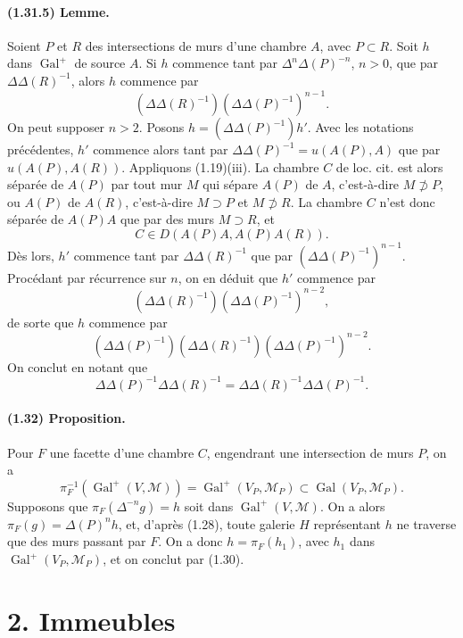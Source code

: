 \documentclass[10pt]{article}
\begin{document}
\paragraph{(1.31.5) Lemme.} Soient \(P\) et \(R\) des intersections de murs d'une chambre \(A\), avec \(P\subset R\). Soit \(h\) dans \(\operatorname{Gal}^+\) de source \(A\). Si \(h\) commence tant par \(\Delta^n\Delta(P)^{-n}\), \(n>0\), que par \(\Delta\Delta(R)^{-1}\), alors \(h\) commence par
\[
(\Delta\Delta(R)^{-1})(\Delta\Delta(P)^{-1})^{n-1}.
\]
On peut supposer \(n>2\). Posons \(h=(\Delta\Delta(P)^{-1})h'\). Avec les notations précédentes, \(h'\) commence alors tant par \(\Delta\Delta(P)^{-1}=u(A(P),A)\) que par \(u(A(P),A(R))\). Appliquons (1.19)(iii). La chambre \(C\) de loc. cit. est alors séparée de \(A(P)\) par tout mur \(M\) qui sépare \(A(P)\) de \(A\), c'est-à-dire \(M\not\supset P\), ou \(A(P)\) de \(A(R)\), c'est-à-dire \(M\supset P\) et \(M\not\supset R\). La chambre \(C\) n'est donc séparée de \(A(P)A\) que par des murs \(M\supset R\), et
\[
C\in D(A(P)A,A(P)A(R)).
\]
Dès lors, \(h'\) commence tant par \(\Delta\Delta(R)^{-1}\) que par \((\Delta\Delta(P)^{-1})^{n-1}\). Procédant par récurrence sur \(n\), on en déduit que \(h'\) commence par
\[
(\Delta\Delta(R)^{-1})(\Delta\Delta(P)^{-1})^{n-2},
\]
de sorte que \(h\) commence par
\[
(\Delta\Delta(P)^{-1})(\Delta\Delta(R)^{-1})(\Delta\Delta(P)^{-1})^{n-2}.
\]
On conclut en notant que
\[
\Delta\Delta(P)^{-1}\Delta\Delta(R)^{-1}
=\Delta\Delta(R)^{-1}\Delta\Delta(P)^{-1}.
\]

\paragraph{(1.32) Proposition.} Pour \(F\) une facette d'une chambre \(C\), engendrant une intersection de murs \(P\), on a
\[
\pi_F^{-1}(\operatorname{Gal}^+(V,\mathcal M))
=
\operatorname{Gal}^+(V_P,\mathcal M_P)\subset \operatorname{Gal}(V_P,\mathcal M_P).
\]
Supposons que \(\pi_F(\Delta^{-n}g)=h\) soit dans \(\operatorname{Gal}^+(V,\mathcal M)\). On a alors \(\pi_F(g)=\Delta(P)^n h\), et, d'après (1.28), toute galerie \(H\) représentant \(h\) ne traverse que des murs passant par \(F\). On a donc \(h=\pi_F(h_1)\), avec \(h_1\) dans \(\operatorname{Gal}^+(V_P,\mathcal M_P)\), et on conclut par (1.30).

\section*{2. Immeubles}
\end{document}
